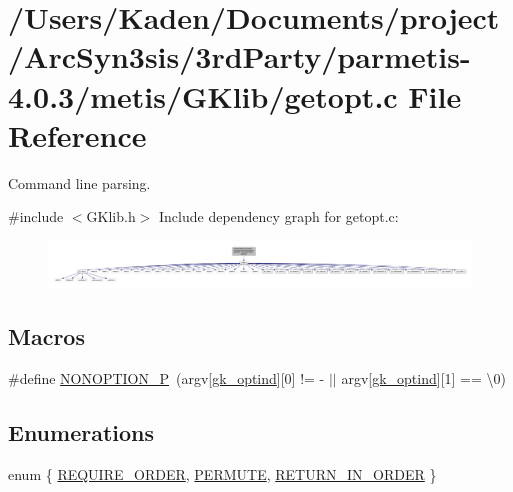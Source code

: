 \hypertarget{a00038}{}\section{/\+Users/\+Kaden/\+Documents/project/\+Arc\+Syn3sis/3rd\+Party/parmetis-\/4.0.3/metis/\+G\+Klib/getopt.c File Reference}
\label{a00038}


Command line parsing.  


{\ttfamily \#include $<$G\+Klib.\+h$>$}\newline
Include dependency graph for getopt.\+c\+:\nopagebreak
\begin{figure}[H]
\begin{center}
\leavevmode
\includegraphics[width=350pt]{a00039}
\end{center}
\end{figure}
\subsection*{Macros}
\begin{DoxyCompactItemize}
\item 
\#define \hyperlink{a00038_a71ceb8911d64b39b402041ba5ea8453c}{N\+O\+N\+O\+P\+T\+I\+O\+N\+\_\+P}~(argv\mbox{[}\hyperlink{a00050_ab70fc0e7e22192b687bd0d377bf61e32}{gk\+\_\+optind}\mbox{]}\mbox{[}0\mbox{]} != \textquotesingle{}-\/\textquotesingle{} $\vert$$\vert$ argv\mbox{[}\hyperlink{a00050_ab70fc0e7e22192b687bd0d377bf61e32}{gk\+\_\+optind}\mbox{]}\mbox{[}1\mbox{]} == \textquotesingle{}\textbackslash{}0\textquotesingle{})
\end{DoxyCompactItemize}
\subsection*{Enumerations}
\begin{DoxyCompactItemize}
\item 
enum \{ \hyperlink{a00038_a06fc87d81c62e9abb8790b6e5713c55ba0e73a0691c110b1442d8364d1d12eccc}{R\+E\+Q\+U\+I\+R\+E\+\_\+\+O\+R\+D\+ER}, 
\hyperlink{a00038_a06fc87d81c62e9abb8790b6e5713c55bacfdde4b47c27f4efbd832e1ac7f8a8fc}{P\+E\+R\+M\+U\+TE}, 
\hyperlink{a00038_a06fc87d81c62e9abb8790b6e5713c55ba3c56550bfafe809d9214b863b69c31c5}{R\+E\+T\+U\+R\+N\+\_\+\+I\+N\+\_\+\+O\+R\+D\+ER}
 \}
\end{DoxyCompactItemize}
